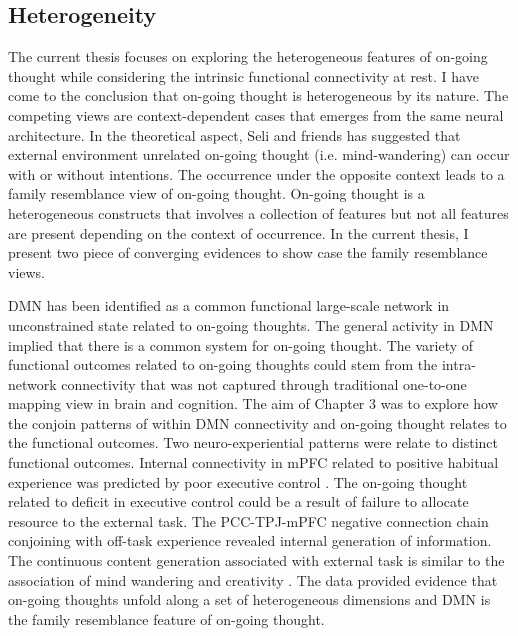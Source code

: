 \subsection{Heterogeneity}
The current thesis focuses on exploring the heterogeneous features of on-going thought while considering the intrinsic functional connectivity at rest. I have come to the conclusion that on-going thought is heterogeneous by its nature. The competing views are context-dependent cases that emerges from the same neural architecture. In the theoretical aspect, Seli and friends \cite{Seli2018,SeliTiCS2016} has suggested that external environment unrelated on-going thought (i.e. mind-wandering) can occur with or without intentions. The occurrence under the opposite context leads to a family resemblance view of on-going thought. On-going thought is a heterogeneous constructs that involves a collection of features but not all features are present depending on the context of occurrence. In the current thesis, I present two piece of converging evidences to show case the family resemblance views.

DMN has been identified as a common functional large-scale network in unconstrained state related to on-going thoughts. The general activity in DMN implied that there is a common system for on-going thought. The variety of functional outcomes related to on-going thoughts could stem from the intra-network connectivity that was not captured through traditional one-to-one mapping view in brain and cognition. The aim of Chapter 3 %
was to explore how the conjoin patterns of within DMN connectivity and on-going thought relates to the functional outcomes. Two neuro-experiential patterns were relate to distinct functional outcomes. Internal connectivity in mPFC related to positive habitual experience was predicted by poor executive control \cite{McVay2009}. The on-going thought related to deficit in executive control could be a result of failure to allocate resource to the external task. The PCC-TPJ-mPFC negative connection chain conjoining with off-task experience revealed internal generation of information. The continuous content generation associated with external task is similar to the association of mind wandering and creativity \cite{Baird2012}. The data provided evidence that on-going thoughts unfold along a set of heterogeneous dimensions and DMN is the family resemblance feature of on-going thought.

